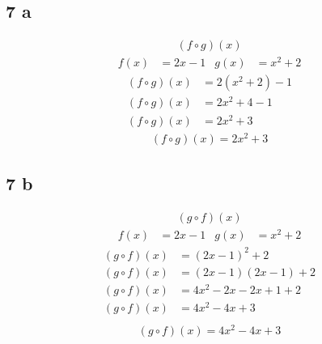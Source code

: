 \documentclass{article}
\begin{document}
    \subsection*{7 a}
    \begin{align*}
    (f \circ g)(x)
    \end{align*}
    \begin{align*}
        f(x) &= 2x - 1  &g(x) &= x^2 + 2
    \end{align*}
    \begin{align*}
    (f \circ g)(x) &= 2(x^2 +2) - 1\\
    (f \circ g)(x) &= 2x^2 + 4 - 1\\
    (f \circ g)(x) &= 2x^2 + 3
    \end{align*}
    \begin{align*}
        \boxed{(f \circ g)(x) = 2x^2 + 3 }
    \end{align*}

    \subsection*{7 b}
    \begin{align*}
    (g \circ f)(x)
    \end{align*}
    \begin{align*}
        f(x) &= 2x - 1  &g(x) &= x^2 + 2
    \end{align*}
    \begin{align*}
    (g \circ f)(x) &= (2x - 1)^2 + 2\\
    (g \circ f)(x) &= (2x - 1)(2x - 1) + 2\\
    (g \circ f)(x) &= 4x^2 - 2x - 2x +1 + 2\\
    (g \circ f)(x) &= 4x^2 - 4x +3 \\
    \end{align*}
    \begin{align*}
        \boxed{(g \circ f)(x) = 4x^2 - 4x +3}
    \end{align*}
\end{document}
